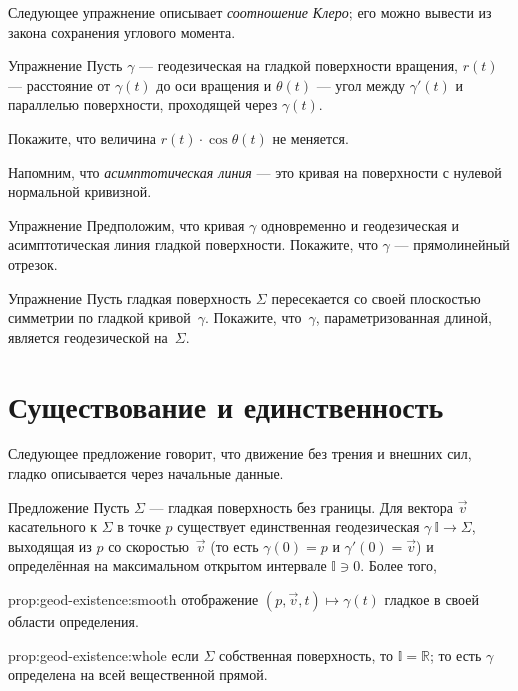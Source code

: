 {\sloppy

Следующее упражнение описывает \emph{соотношение Клеро};
его можно вывести из закона сохранения углового момента.

}

\begin{thm}{Упражнение}\label{ex:clairaut}
Пусть $\gamma$ --- геодезическая на гладкой поверхности вращения,
$r(t)$ --- расстояние от $\gamma(t)$ до оси вращения
и $\theta(t)$ --- угол между $\gamma'(t)$ и параллелью поверхности, проходящей через $\gamma(t)$. 

Покажите, что величина $r(t)\cdot \cos\theta(t)$ не меняется. 
\end{thm}

Напомним, что {}\emph{асимптотическая линия} --- это кривая на поверхности с нулевой нормальной кривизной.

\begin{thm}{Упражнение}\label{ex:asymptotic-geodesic}
Предположим, что кривая $\gamma$ одновременно и геодезическая и асимптотическая линия гладкой поверхности.
Покажите, что $\gamma$ --- прямолинейный отрезок.
\end{thm}

\begin{thm}{Упражнение}\label{ex:reflection-geodesic}
Пусть гладкая поверхность $\Sigma$ пересекается со своей плоскостью симметрии по гладкой кривой~$\gamma$.
Покажите, что~$\gamma$, параметризованная длиной, является геодезической на~$\Sigma$.
\end{thm}

\section{Существование и единственность}

{\sloppy

Следующее предложение говорит, что движение без трения и внешних сил, гладко описывается через начальные данные.

}

\begin{thm}{Предложение}\label{prop:geod-existence} 
Пусть $\Sigma$ --- гладкая поверхность без границы.
Для вектора ${\vec v}$ касательного к $\Sigma$ в точке $p$ существует единственная геодезическая $\gamma\:\mathbb{I}\to \Sigma$, выходящая из $p$ со скоростью~${\vec v}$ (то есть $\gamma(0)=p$ и $\gamma'(0)={\vec v}$) и определённая на максимальном открытом интервале $\mathbb{I}\ni 0$.
Более того,
\begin{subthm}{prop:geod-existence:smooth} отображение $(p,{\vec v},t)\mapsto \gamma(t)$ гладкое в своей области определения.
\end{subthm}

\begin{subthm}{prop:geod-existence:whole} если $\Sigma$ собственная поверхность, то $\mathbb{I}=\mathbb{R}$; то есть $\gamma$ определена на всей вещественной прямой.
\end{subthm}

\end{thm}

